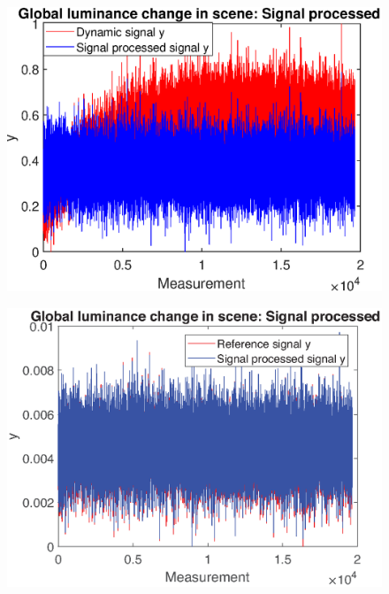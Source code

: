 \begin{figure}[H]
    \centering
\begin{minipage}[t]{0.48\textwidth}
    \includegraphics[width = \textwidth]{result/dynamic/lum/intense_change_sp.eps}
    \subcaption{}
    \label{fig:lum_sig_2}
\end{minipage}
\begin{minipage}[t]{0.51\textwidth}
    \includegraphics[width=1\textwidth]{result/dynamic/lum/intense_change_sp_ref1.eps}
    \subcaption{}
    \label{fig:lum_sig_3}
\end{minipage}
\begin{minipage}[t]{0.50\textwidth}

\end{minipage}
\end{figure}
